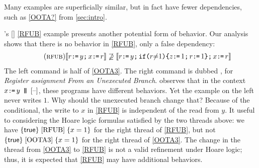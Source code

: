 
Many examples are superficially similar, but in fact have fewer dependencies,
such as \eqref{OOTA?} from \textsection\ref{sec:intro}.

\citeauthor{BoehmOOTA}'s [\citeyear{BoehmOOTA}] \ref{RFUB} example presents
another potential form of \oota{} behavior.
Our analysis shows that there is no \oota{} behavior in
\ref{RFUB}, only a false dependency:
\begin{gather*}
  \tag{\textsc{rfub}}\label{RFUB}
  \sem{r\GETS y\SEMI x\GETS r}
  \not\supseteq
  \sem{r\GETS y\SEMI \IF{r \NOTEQ 1} \THEN z\GETS 1\SEMI r\GETS 1\FI \SEMI x\GETS r}
\end{gather*}
The left command is half of \ref{OOTA3}. %
The right command is dubbed \rfub{}, for \emph{Register assignment From an
  Unexecuted Branch}.  \citeauthor{BoehmOOTA} observes that in the context
$x\GETS y \PAR \hole{}$, these programs have different behaviors.  Yet the
\oota{} example on the left never writes $1$.  Why should the unexecuted
branch change that?  Because of the conditional, the write to $x$ in
\ref{RFUB} is independent of the read from $y$.  It useful to considering the
Hoare logic formulas satisfied by the two threads above: we have
$\{\mathsf{true}\}\allowbreak\;\ref{RFUB}\;\allowbreak\{x=1\}$ for the right thread of \ref{RFUB}, but not
$\{\mathsf{true}\}\allowbreak\;\ref{OOTA3}\;\allowbreak\{x=1\}$ for the right thread of \ref{OOTA3}.  The
change in the thread from \ref{OOTA3} to \ref{RFUB} is not a valid refinement
under Hoare logic; thus, it is expected that \ref{RFUB} may have additional
behaviors.

